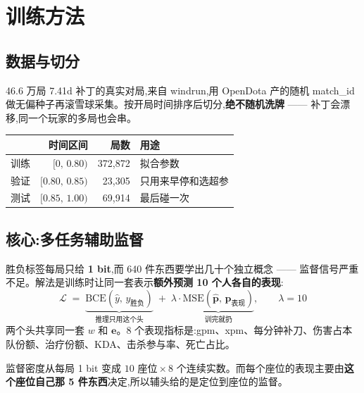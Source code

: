 \documentclass[11pt,a4paper]{article}
\begin{document}
\medskip
\noindent{}

\section{训练方法}

\subsection{数据与切分}

46.6 万局 7.41d 补丁的真实对局,来自 windrun,用 OpenDota 产的随机 match\_id 做无偏种子再滚雪球采集。按开局时间排序后切分,\textbf{绝不随机洗牌} —— 补丁会漂移,同一个玩家的多局也会串。

\begin{center}
\begin{tabular}{@{}lrr l@{}}
\toprule
& 时间区间 & 局数 & 用途\\
\midrule
训练 & $[0,\,0.80)$ & 372,872 & 拟合参数\\
验证 & $[0.80,\,0.85)$ & 23,305 & 只用来早停和选超参\\
测试 & $[0.85,\,1.00)$ & 69,914 & 最后碰一次\\
\bottomrule
\end{tabular}
\end{center}

\subsection{核心:多任务辅助监督}

胜负标签每局只给 \textbf{1 bit},而 640 件东西要学出几十个独立概念 —— 监督信号严重不足。解法是训练时让同一套表示\textbf{额外预测 10 个人各自的表现}:
\[
\mathcal{L} \;=\; \underbrace{\mathrm{BCE}(\hat{y},\,y_{\text{胜负}})}_{\text{推理只用这个头}}\;+\;\lambda\cdot\underbrace{\mathrm{MSE}(\hat{\mathbf{p}},\,\mathbf{p}_{\text{表现}})}_{\text{训完就扔}},\qquad \lambda=10
\]
两个头共享同一套 $w$ 和 $\mathbf{e}$。8 个表现指标是:gpm、xpm、每分钟补刀、伤害占本队份额、治疗份额、KDA、击杀参与率、死亡占比。

监督密度从每局 1 bit 变成 $10\text{ 座位}\times 8\text{ 个连续实数}$。而每个座位的表现主要由\textbf{这个座位自己那 5 件东西}决定,所以辅头给的是定位到座位的监督。
\end{document}
